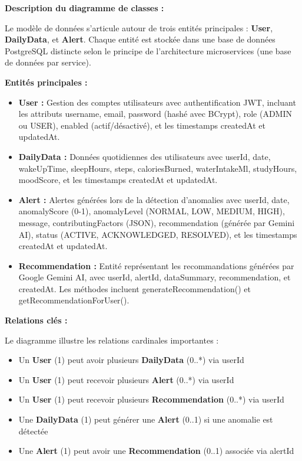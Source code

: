 \textbf{Description du diagramme de classes :}

Le modèle de données s'articule autour de trois entités principales : \textbf{User}, \textbf{DailyData}, et \textbf{Alert}. Chaque entité est stockée dans une base de données PostgreSQL distincte selon le principe de l'architecture microservices (une base de données par service).

\textbf{Entités principales :}

\begin{itemize}
    \item \textbf{User :} Gestion des comptes utilisateurs avec authentification JWT, incluant les attributs username, email, password (hashé avec BCrypt), role (ADMIN ou USER), enabled (actif/désactivé), et les timestamps createdAt et updatedAt.
    \item \textbf{DailyData :} Données quotidiennes des utilisateurs avec userId, date, wakeUpTime, sleepHours, steps, caloriesBurned, waterIntakeMl, studyHours, moodScore, et les timestamps createdAt et updatedAt.
    \item \textbf{Alert :} Alertes générées lors de la détection d'anomalies avec userId, date, anomalyScore (0-1), anomalyLevel (NORMAL, LOW, MEDIUM, HIGH), message, contributingFactors (JSON), recommendation (générée par Gemini AI), status (ACTIVE, ACKNOWLEDGED, RESOLVED), et les timestamps createdAt et updatedAt.
    \item \textbf{Recommendation :} Entité représentant les recommandations générées par Google Gemini AI, avec userId, alertId, dataSummary, recommendation, et createdAt. Les méthodes incluent generateRecommendation() et getRecommendationForUser().
\end{itemize}

\textbf{Relations clés :}

Le diagramme illustre les relations cardinales importantes :
\begin{itemize}
    \item Un \textbf{User} (1) peut avoir plusieurs \textbf{DailyData} (0..*) via userId
    \item Un \textbf{User} (1) peut recevoir plusieurs \textbf{Alert} (0..*) via userId
    \item Un \textbf{User} (1) peut recevoir plusieurs \textbf{Recommendation} (0..*) via userId
    \item Une \textbf{DailyData} (1) peut générer une \textbf{Alert} (0..1) si une anomalie est détectée
    \item Une \textbf{Alert} (1) peut avoir une \textbf{Recommendation} (0..1) associée via alertId
\end{itemize}

